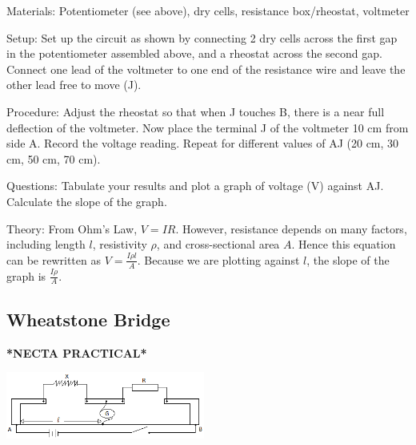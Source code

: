 \begin{multicols}{2}
\begin{description*}
\item[Materials:]{Potentiometer (see above), dry cells, resistance box/rheostat, voltmeter}
\item[Setup:]{Set up the circuit as shown by connecting 2 dry cells across the first gap in the potentiometer assembled above, and a rheostat across the second gap. Connect one lead of the voltmeter to one end of the resistance wire and leave the other lead free to move (J).}
\item[Procedure:]{Adjust the rheostat so that when J touches B, there is a near full deflection of the voltmeter. Now place the terminal J of the voltmeter 10 cm from side A. Record the voltage reading. Repeat for different values of AJ (20 cm, 30 cm, 50 cm, 70 cm).}
\item[Questions:]{Tabulate your results and plot a graph of voltage (V) against AJ. Calculate the slope of the graph.}
\item[Theory:]{From Ohm's Law, $V = IR$. However, resistance depends on many factors, including length $l$, resistivity $\rho$, and cross-sectional area $A$. Hence this equation can be rewritten as $V = \frac{I \rho l}{A}$. Because we are plotting against $l$, the slope of the graph is $\frac{I \rho}{A}$.}
\end{description*}

\subsection{Wheatstone Bridge}
\textbf{*NECTA PRACTICAL*}

\begin{center}
\includegraphics[width=0.49\textwidth]{./img/metre-bridge-assembly.png}
\end{center}


\end{multicols}
